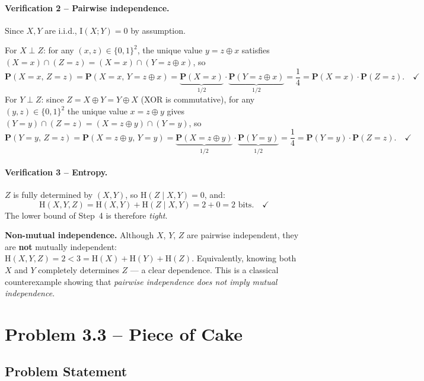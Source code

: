 \documentclass[12pt,a4paper]{article}
\theoremstyle{plain}
\theoremstyle{definition}
\theoremstyle{remark}
\newcommand{\HH}{\mathrm{H}}
\newcommand{\II}{\mathrm{I}}
\newcommand{\PP}{\mathbf{P}}
\begin{document}
\paragraph{Verification 2 – Pairwise independence.}

Since $X,Y$ are i.i.d., $\II(X;Y)=0$ by assumption.

For $X\perp Z$: for any $(x,z)\in\{0,1\}^2$, the unique value $y=z\oplus x$
satisfies $(X=x)\cap(Z=z) = (X=x)\cap(Y=z\oplus x)$, so
\[
  \PP(X=x,\,Z=z)
    = \PP(X=x,\,Y=z\oplus x)
    = \underbrace{\PP(X=x)}_{1/2}\cdot\underbrace{\PP(Y=z\oplus x)}_{1/2}
    = \frac{1}{4}
    = \PP(X=x)\cdot\PP(Z=z). \quad\checkmark
\]
For $Y\perp Z$: since $Z = X\oplus Y = Y\oplus X$ (XOR is commutative),
for any $(y,z)\in\{0,1\}^2$ the unique value $x = z\oplus y$ gives
$(Y=y)\cap(Z=z) = (X=z\oplus y)\cap(Y=y)$, so
\[
  \PP(Y=y,\,Z=z)
    = \PP(X=z\oplus y,\,Y=y)
    = \underbrace{\PP(X=z\oplus y)}_{1/2}\cdot\underbrace{\PP(Y=y)}_{1/2}
    = \frac{1}{4}
    = \PP(Y=y)\cdot\PP(Z=z). \quad\checkmark
\]

\paragraph{Verification 3 – Entropy.}

$Z$ is fully determined by $(X,Y)$, so $\HH(Z\mid X,Y)=0$, and:
\[
  \HH(X,Y,Z) = \HH(X,Y) + \HH(Z\mid X,Y) = 2 + 0 = 2\text{ bits.} \quad\checkmark
\]
The lower bound of Step~4 is therefore \emph{tight}.

\begin{notebox}
\textbf{Non-mutual independence.}
Although $X$, $Y$, $Z$ are pairwise independent, they are \textbf{not} mutually
independent: $\HH(X,Y,Z) = 2 < 3 = \HH(X)+\HH(Y)+\HH(Z)$.  Equivalently,
knowing both $X$ and $Y$ completely determines $Z$ — a clear dependence.
This is a classical counterexample showing that
\emph{pairwise independence does not imply mutual independence}.
\end{notebox}

\newpage
\section{Problem 3.3 – Piece of Cake}

\subsection*{Problem Statement}
\end{document}
